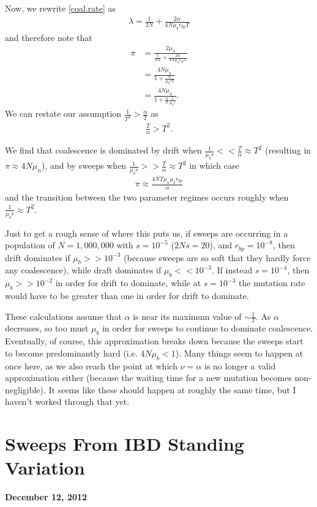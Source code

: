 \documentclass[reqno]{amsart}
\begin{document}
Now, we rewrite \eqref{coal.rate} as 
\begin{align}
	\lambda = \frac{1}{2N} + \frac{2\alpha}{4N\mu_br_{bp}T}
\end{align}
and therefore note that
\begin{align}
	\pi &= \frac{2\mu_n}{\frac{1}{2N} + \frac{2\alpha}{4N\mu_br_{bp}T}}\\
	&= \frac{4N\mu_n}{1 + \frac{\alpha}{\mu_b r T}}\\
	&= \frac{4N\mu_n}{1 + \frac{\alpha}{T}\frac{1}{\mu_b r}}.
\end{align}
We can restate our assumption $\frac{1}{T^2} > \frac{\alpha}{T}$ as
\begin{align}
	\frac{T}{\alpha} > T^2.
\end{align}

We find that coalescence is dominated by drift when $\frac{1}{\mu_b r} << \frac{T}{\alpha} \approx T^2$ (resulting in $\pi \approx 4N\mu_n$), and by sweeps when $\frac{1}{\mu_b r} >> \frac{T}{\alpha} \approx T^2$ in which case 
\begin{align}
	\pi \approx \frac{4NT\mu_n\mu_b r_{bp}}{\alpha}
\end{align}
and the transition between the two parameter regimes occurs roughly when $\frac{1}{\mu_b r} \approx T^2$. 

Just to get a rough sense of where this puts us, if sweeps are occurring in a population of $N = 1,000,000$ with $s=10^{-5}$ ($2Ns = 20$), and $r_{bp} = 10^{-8}$, then drift dominates if $\mu_{b}>>10^{-3}$ (because sweeps are so soft that they hardly force any coalescence), while draft dominates if $\mu_b<<10^{-3}$. If instead $s=10^{-4}$, then $\mu_b>>10^{-2}$ in order for drift to dominate, while at $s=10^{-3}$ the mutation rate would have to be greater than one in order for drift to dominate. 

These calculations assume that $\alpha$ is near its maximum value of $\sim\frac{1}{T}$. As $\alpha$ decreases, so too must $\mu_b$ in order for sweeps to continue to dominate coalescence. Eventually, of course, this approximation breaks down because the sweeps start to become predominantly hard (i.e. $4N\mu_b < 1$). Many things seem to happen at once here, as we also reach the point at which $\nu = \alpha$ is no longer a valid approximation either (because the waiting time for a new mutation becomes non-negligible). It seems like these should happen at roughly the same time, but I haven't worked through that yet.

\section*{Sweeps From IBD Standing Variation} 
\begin{flushright}
	\textbf{December 12, 2012}
\end{flushright}
\end{document}
